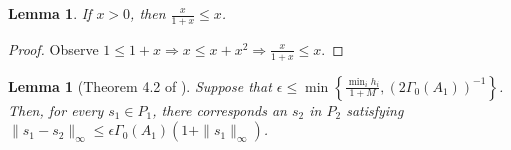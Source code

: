 \documentclass{article}
\newtheorem{lemma}[theorem]{Lemma}
\theoremstyle{case}
\newcommand{\huff}{{\Gamma_0}}
\begin{document}
\begin{lemma}
\label{simple_bound}
If $x > 0$, then $\frac {x}{1+x} \le x$.
\end{lemma}
\begin{proof}
Observe $1 \le 1 + x\Longrightarrow x \le x + x^2 \Longrightarrow \frac {x}{1+x} \le x$.
\end{proof}




\begin{lemma}[Theorem 4.2 of \cite{dummy:perturbations}]
\label{4_2}
Suppose that $\epsilon\le \min\left\{\frac{\min_i h_i}{1 + M},\left(2\huff(A_1)\right)^{-1}\right\}$.
Then, for every $s_1 \in P_1$,
there corresponds an $s_2$ in $P_2$ satisfying 
$\|s_1 - s_2\|_{\infty}\le \epsilon\huff(A_1)\left(1 + \|s_1\|_{\infty}\right)$.
\end{lemma}
\end{document}
